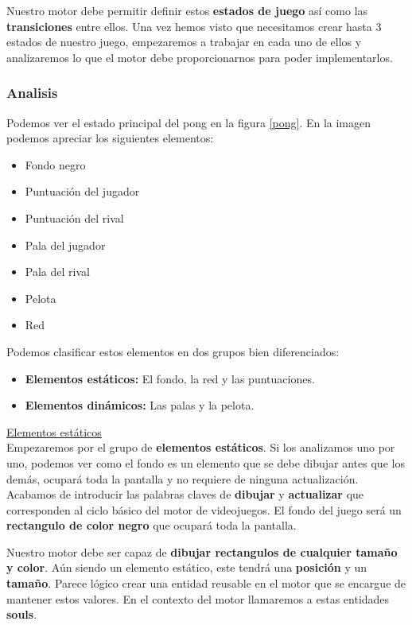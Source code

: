 \documentclass[a4paper]{article}
\begin{document}
Nuestro motor debe permitir definir estos \textbf{estados de juego} así como las \textbf{transiciones} entre ellos. Una vez hemos visto que necesitamos crear hasta 3 estados de nuestro juego, empezaremos a trabajar en cada uno de ellos y analizaremos lo que el motor debe proporcionarnos para poder implementarlos.

\subsubsection{Analisis}

Podemos ver el estado principal del pong en la figura \ref{pong}. En la imagen podemos apreciar los siguientes elementos:
\begin{itemize}
  \item Fondo negro
  \item Puntuación del jugador
  \item Puntuación del rival
  \item Pala del jugador
  \item Pala del rival
  \item Pelota
  \item Red
\end{itemize}

Podemos clasificar estos elementos en dos grupos bien diferenciados:
\begin{itemize}
  \item \textbf{Elementos estáticos:} El fondo, la red y las puntuaciones.
  \item \textbf{Elementos dinámicos:} Las palas y la pelota.
\end{itemize}

\underline{Elementos estáticos} \\

Empezaremos por el grupo de \textbf{elementos estáticos}. Si los analizamos uno por uno, podemos ver como el fondo es un elemento que se debe dibujar antes que los demás, ocupará toda la pantalla y no requiere de ninguna actualización. Acabamos de introducir las palabras claves de \textbf{dibujar} y \textbf{actualizar} que corresponden al ciclo básico del motor de videojuegos.
El fondo del juego será un \textbf{rectangulo de color negro} que ocupará toda la pantalla. 

Nuestro motor debe ser capaz de \textbf{dibujar rectangulos de cualquier tamaño y color}. Aún siendo un elemento estático, este tendrá una \textbf{posición} y un \textbf{tamaño}. Parece lógico crear una entidad reusable en el motor que se encargue de mantener estos valores. En el contexto del motor llamaremos a estas entidades \textbf{souls}.
\end{document}
